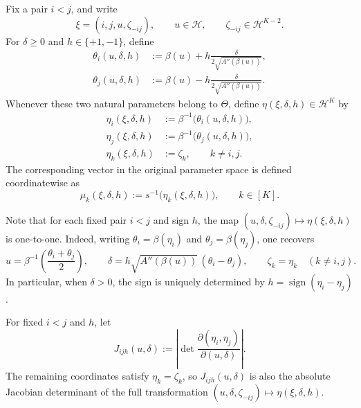 \documentclass[10pt]{article}
\theoremstyle{plain}
\begin{document}
\begin{definition}
\label{def:local-coordinate-transfer-lower}
Fix a pair $i<j$, and write
\[
    \xi=(i,j,u,\zeta_{-ij}),
    \qquad
    u\in\mathcal H,
    \qquad
    \zeta_{-ij}\in\mathcal H^{K-2}.
\]
For $\delta\ge0$ and $h\in\{+1,-1\}$, define
\[
\begin{aligned}
    \theta_i(u,\delta,h)
    &:=
    \beta(u)
    +
    h\frac{\delta}{2\sqrt{A''(\beta(u))}},\\
    \theta_j(u,\delta,h)
    &:=
    \beta(u)
    -
    h\frac{\delta}{2\sqrt{A''(\beta(u))}}.
\end{aligned}
\]
Whenever these two natural parameters belong to $\Theta$, define
$\eta(\xi,\delta,h)\in\mathcal H^K$ by
\begin{equation}
\label{eq:local-chart-transfer-lower}
\begin{aligned}
    \eta_i(\xi,\delta,h)
    &:=
    \beta^{-1}\bigl(\theta_i(u,\delta,h)\bigr),\\
    \eta_j(\xi,\delta,h)
    &:=
    \beta^{-1}\bigl(\theta_j(u,\delta,h)\bigr),\\
    \eta_k(\xi,\delta,h)
    &:=
    \zeta_k,
    \qquad k\neq i,j.
\end{aligned}
\end{equation}
The corresponding vector in the original parameter space is defined
coordinatewise as
\[
    \mu_k(\xi,\delta,h)
    :=
    s^{-1}\bigl(\eta_k(\xi,\delta,h)\bigr),
    \qquad k\in[K].
\]
\end{definition}

Note that for each fixed pair $i<j$ and sign $h$, the map
    $(u,\delta,\zeta_{-ij})
    \longmapsto
    \eta(\xi,\delta,h)$
is one-to-one. Indeed, writing
$\theta_i=\beta(\eta_i)$ and $\theta_j=\beta(\eta_j)$, one recovers
\[
    u
    =
    \beta^{-1}\left(\frac{\theta_i+\theta_j}{2}\right),
    \qquad
    \delta
    =
    h\sqrt{A''(\beta(u))}\,(\theta_i-\theta_j),
    \qquad
    \zeta_k=\eta_k
    \quad(k\neq i,j).
\]
In particular, when $\delta>0$, the sign is uniquely determined by
$h=\operatorname{sign}(\eta_i-\eta_j)$.

For fixed $i<j$ and $h$, let
\[
    J_{ijh}(u,\delta)
    :=
    \left|
        \det
        \frac{\partial(\eta_i,\eta_j)}
             {\partial(u,\delta)}
    \right|.
\]
The remaining coordinates satisfy $\eta_k=\zeta_k$, so
$J_{ijh}(u,\delta)$ is also the absolute Jacobian determinant of the full
transformation
$(u,\delta,\zeta_{-ij})\mapsto\eta(\xi,\delta,h)$.
\end{document}
